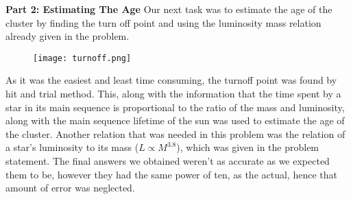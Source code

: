 \documentclass{article}
\begin{document}
\newpage
\textbf{\Large Part 2: Estimating The Age}
\newline
\newline
\newline
Our next task was to estimate the age of the cluster by finding the turn off point and using the luminosity mass relation already given in the problem.
\begin{figure}[H]
\caption{}
\centering
\texttt{[image: turnoff.png]}\newline
\end{figure}
As it was the easiest and least time consuming, the turnoff point was found by hit and trial method. This, along with the information that the time spent by a star in its main sequence is proportional to the ratio of the mass and luminosity, along with the main sequence lifetime of the sun was used to estimate the age of the cluster. Another relation that was needed in this problem was the relation of a star's luminosity to its mass ($L \propto M^{3.8}$), which was given in the problem statement. The final answers we obtained weren't as accurate as we expected them to be, however they had the same power of ten, as the actual, hence that amount of error was neglected.
\newpage
\end{document}
